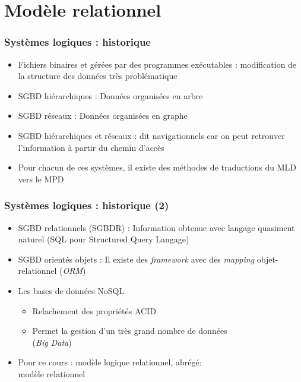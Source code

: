 \section[Modèle relationnel]{Modèle relationnel}


\begin{frame}
  \frametitle{Systèmes logiques : historique}
  \begin{itemize}
    \item Fichiers binaires et gérées par des programmes exécutables : modification de la structure des données très problématique
    \item SGBD hiérarchiques : Données organisées en arbre
    \item SGBD réseaux : Données organisées en graphe
    \item SGBD hiérarchiques et réseaux : dit navigationnels car on peut retrouver l'information à
      partir du chemin d'accès
    \item Pour chacun de ces systèmes, il existe des méthodes de traductions du MLD vers le MPD 
  \end{itemize}
\end{frame}

\begin{frame}
  \frametitle{Systèmes logiques : historique (2)}
  \begin{itemize}
    \item SGBD relationnels (SGBDR) : Information obtenue avec langage quasiment naturel (SQL pour
      Structured Query Langage)
    \item SGBD orientés objets : Il existe des \emph{framework} avec des \emph{mapping} objet-relationnel
      (\emph{ORM})
    \item Les bases de données NoSQL
      \begin{itemize}
        \item Relachement des propriétés ACID
        \item Permet la gestion d'un très grand nombre de données\\(\emph{Big Data})
      \end{itemize}
    \item Pour ce cours : modèle logique relationnel, abrégé:\\\og modèle relationnel \fg
  \end{itemize}
\end{frame}

